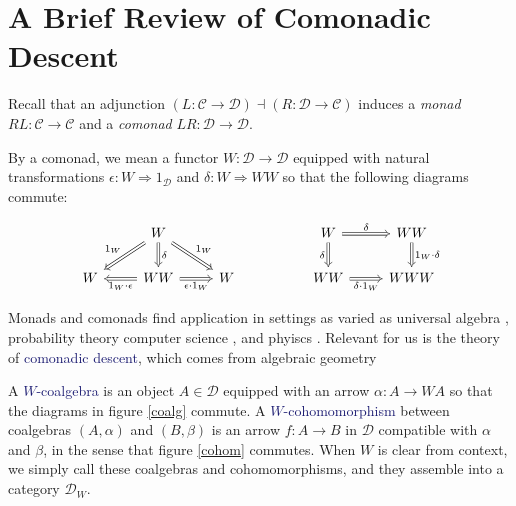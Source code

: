 \documentclass[12pt]{article}
\theoremstyle{definition}
\theoremstyle{theorem}
\newcommand*{\catVarFont}[1]{\mathcal{#1}}
\newcommand{\catC}{\catVarFont{C}}
\newcommand{\catD}{\catVarFont{D}}
\newcommand*{\important}[1]{\textcolor{MidnightBlue}{#1}}
\begin{document}
\section{A Brief Review of Comonadic Descent}


Recall that an adjunction
$(L : \catC \to \catD) \dashv (R : \catD \to \catC)$
induces a \emph{monad} $RL : \catC \to \catC$ and a \emph{comonad}
$LR : \catD \to \catD$.

By a comonad, we mean a functor $W : \catD \to \catD$ equipped with natural
transformations $\epsilon : W \Rightarrow 1_\catD$ and $\delta : W \Rightarrow WW$
so that the following diagrams commute:

\[
    \begin{tikzcd}
    & W &&& W & WW \\
    W & WW & W && WW & WWW
    \arrow["{1_W \cdot \epsilon}", Rightarrow, from=2-2, to=2-1]
    \arrow["{\epsilon \cdot 1_W}"', Rightarrow, from=2-2, to=2-3]
    \arrow["\delta", Rightarrow, from=1-2, to=2-2]
    \arrow["{1_W}"', Rightarrow, from=1-2, to=2-1]
    \arrow["{1_W}", Rightarrow, from=1-2, to=2-3]
    \arrow["\delta"', Rightarrow, from=1-5, to=2-5]
    \arrow["\delta", Rightarrow, from=1-5, to=1-6]
    \arrow["{\delta \cdot 1_W}"', Rightarrow, from=2-5, to=2-6]
    \arrow["{1_W \cdot \delta}", Rightarrow, from=1-6, to=2-6]
    \end{tikzcd}
\]

Monads and comonads find application in settings as varied as universal algebra 
, probability theory 
computer science ,
and phyiscs .
Relevant for us is the theory of \important{comonadic descent}, 
which comes from algebraic geometry 

A \important{$W$-coalgebra} is an object
$A \in \catD$ equipped with an arrow $\alpha : A \to WA$ so that the
diagrams in figure \ref{coalg} commute. A \important{$W$-cohomomorphism}
between coalgebras $(A,\alpha)$ and $(B,\beta)$ is an arrow $f : A \to B$
in $\mathcal{D}$ compatible with $\alpha$ and $\beta$, in the sense that 
figure \ref{cohom} commutes. When $W$ is clear from context, we simply call these
coalgebras and cohomomorphisms, and they assemble into a category $\catD_W$.
\end{document}
